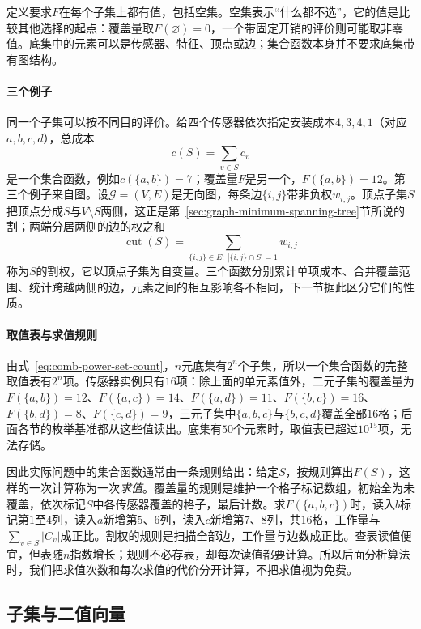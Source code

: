 定义要求$F$在每个子集上都有值，包括空集。空集表示“什么都不选”，它的值是比较其他选择的起点：覆盖量取$F(\varnothing)=0$，一个带固定开销的评价则可能取非零值。底集中的元素可以是传感器、特征、顶点或边；集合函数本身并不要求底集带有图结构。

\paragraph{三个例子}
同一个子集可以按不同目的评价。给四个传感器依次指定安装成本$4,3,4,1$（对应$a,b,c,d$），总成本
\[
  c(S)=\sum_{v\in S}c_v
\]
是一个集合函数，例如$c(\{a,b\})=7$；覆盖量$F$是另一个，$F(\{a,b\})=12$。第三个例子来自图。设$\mathcal G=(V,E)$是无向图，每条边$\{i,j\}$带非负权$w_{i,j}$。顶点子集$S$把顶点分成$S$与$V\setminus S$两侧，这正是第~\ref{sec:graph-minimum-spanning-tree}节所说的割；两端分居两侧的边的权之和
\[
  \operatorname{cut}(S)=\sum_{\{i,j\}\in E:\ |\{i,j\}\cap S|=1}w_{i,j}
\]
称为$S$的割权，它以顶点子集为自变量。三个函数分别累计单项成本、合并覆盖范围、统计跨越两侧的边，元素之间的相互影响各不相同，下一节据此区分它们的性质。

\paragraph{取值表与求值规则}
由式~\eqref{eq:comb-power-set-count}，$n$元底集有$2^n$个子集，所以一个集合函数的完整取值表有$2^n$项。传感器实例只有$16$项：除上面的单元素值外，二元子集的覆盖量为$F(\{a,b\})=12$、$F(\{a,c\})=14$、$F(\{a,d\})=11$、$F(\{b,c\})=16$、$F(\{b,d\})=8$、$F(\{c,d\})=9$，三元子集中$\{a,b,c\}$与$\{b,c,d\}$覆盖全部$16$格；后面各节的枚举基准都从这些值读出。底集有$50$个元素时，取值表已超过$10^{15}$项，无法存储。

因此实际问题中的集合函数通常由一条规则给出：给定$S$，按规则算出$F(S)$，这样的一次计算称为一次\emph{求值}。覆盖量的规则是维护一个格子标记数组，初始全为未覆盖，依次标记$S$中各传感器覆盖的格子，最后计数。求$F(\{a,b,c\})$时，读入$b$标记第$1$至$4$列，读入$a$新增第$5$、$6$列，读入$c$新增第$7$、$8$列，共$16$格，工作量与$\sum_{v\in S}|C_v|$成正比。割权的规则是扫描全部边，工作量与边数成正比。查表读值便宜，但表随$n$指数增长；规则不必存表，却每次读值都要计算。所以后面分析算法时，我们把求值次数和每次求值的代价分开计算，不把求值视为免费。

\subsection{子集与二值向量}
\label{sec:graph-setfn-binary-vectors}

